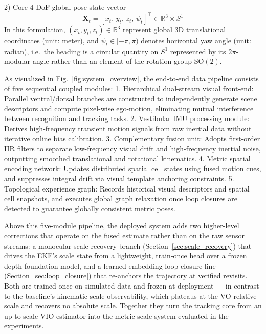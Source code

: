 2) Core 4-DoF global pose state vector
\begin{equation}
    \mathbf{X}_t = \left[ x_t,\, y_t,\, z_t,\, \psi_t \right]^\top \in \mathbb{R}^3 \times S^1
    \label{eq:global_state}
\end{equation}
In this formulation, $(x_t, y_t, z_t) \in \mathbb{R}^3$ represent global 3D translational coordinates (unit: meter), and $\psi_t \in [-\pi,\pi)$ denotes horizontal yaw angle (unit: radian), i.e.\ the heading is a circular quantity on $S^1$ represented by its $2\pi$-modular angle rather than an element of the rotation group $\mathrm{SO}(2)$.

As visualized in Fig.~\ref{fig:system_overview}, the end-to-end data pipeline consists of five sequential coupled modules:
1. Hierarchical dual-stream visual front-end: Parallel ventral/dorsal branches are constructed to independently generate scene descriptors and compute pixel-wise ego-motion, eliminating mutual interference between recognition and tracking tasks.
2. Vestibular IMU processing module: Derives high-frequency transient motion signals from raw inertial data without iterative online bias calibration.
3. Complementary fusion unit: Adopts first-order IIR filters to separate low-frequency visual drift and high-frequency inertial noise, outputting smoothed translational and rotational kinematics.
4. Metric spatial encoding network: Updates distributed spatial cell states using fused motion cues, and suppresses integral drift via visual template anchoring constraints.
5. Topological experience graph: Records historical visual descriptors and spatial cell snapshots, and executes global graph relaxation once loop closures are detected to guarantee globally consistent metric poses.

\noindent Above this five-module pipeline, the deployed system adds two higher-level corrections that operate on the fused estimate rather than on the raw sensor streams: a monocular scale recovery branch (Section~\ref{sec:scale_recovery}) that drives the EKF's scale state from a lightweight, train-once head over a frozen depth foundation model, and a learned-embedding loop-closure line (Section~\ref{sec:loop_closure}) that re-anchors the trajectory at verified revisits. Both are trained once on simulated data and frozen at deployment --- in contrast to the baseline's kinematic scale observability, which plateaus at the VO-relative scale and recovers no absolute scale. Together they turn the tracking core from an up-to-scale VIO estimator into the metric-scale system evaluated in the experiments.

